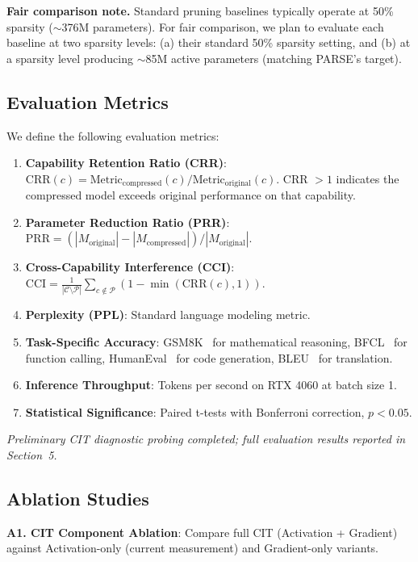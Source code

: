 \documentclass[twocolumn]{article}
\begin{document}
\textbf{Fair comparison note.}
Standard pruning baselines typically operate at 50\% sparsity ($\sim$376M parameters).
For fair comparison, we plan to evaluate each baseline at two sparsity levels: (a) their standard 50\% sparsity setting, and (b) at a sparsity level producing $\sim$85M active parameters (matching PARSE's target).

\subsection{Evaluation Metrics}

We define the following evaluation metrics:

\begin{enumerate}[leftmargin=*]
\item \textbf{Capability Retention Ratio (CRR)}: $\text{CRR}(c) = \text{Metric}_{\text{compressed}}(c) / \text{Metric}_{\text{original}}(c)$. CRR $> 1$ indicates the compressed model exceeds original performance on that capability.
\item \textbf{Parameter Reduction Ratio (PRR)}: $\text{PRR} = (|M_{\text{original}}| - |M_{\text{compressed}}|) / |M_{\text{original}}|$.
\item \textbf{Cross-Capability Interference (CCI)}: $\text{CCI} = \frac{1}{|\mathcal{C} \setminus \mathcal{P}|} \sum_{c \notin \mathcal{P}} (1 - \min(\text{CRR}(c), 1))$.
\item \textbf{Perplexity (PPL)}: Standard language modeling metric.
\item \textbf{Task-Specific Accuracy}: GSM8K~\citep{cobbe2021gsm8k} for mathematical reasoning, BFCL~\citep{bfcl} for function calling, HumanEval~\citep{chen2021humaneval} for code generation, BLEU~\citep{papineni2002bleu} for translation.
\item \textbf{Inference Throughput}: Tokens per second on RTX 4060 at batch size 1.
\item \textbf{Statistical Significance}: Paired t-tests with Bonferroni correction, $p < 0.05$.
\end{enumerate}

\textit{Preliminary CIT diagnostic probing completed; full evaluation results reported in Section~5.}

\subsection{Ablation Studies}

\textbf{A1. CIT Component Ablation}: Compare full CIT (Activation + Gradient) against Activation-only (current measurement) and Gradient-only variants.
\end{document}
